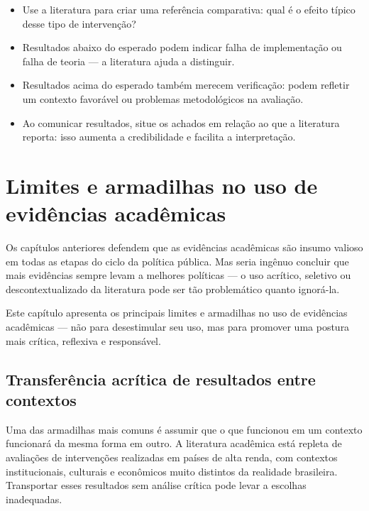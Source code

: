 \documentclass[12pt, a4paper, openany]{book}
\begin{document}
\begin{notabox}
\begin{itemize}[leftmargin=*]
  \item Use a literatura para criar uma referência comparativa: qual é o
    efeito típico desse tipo de intervenção?
  \item Resultados abaixo do esperado podem indicar falha de implementação ou
    falha de teoria --- a literatura ajuda a distinguir.
  \item Resultados acima do esperado também merecem verificação: podem
    refletir um contexto favorável ou problemas metodológicos na avaliação.
  \item Ao comunicar resultados, situe os achados em relação ao que a
    literatura reporta: isso aumenta a credibilidade e facilita a
    interpretação.
\end{itemize}
\end{notabox}

\chapter{Limites e armadilhas no uso de evidências acadêmicas}\label{cap7}

Os capítulos anteriores defendem que as evidências acadêmicas são insumo valioso em todas as etapas do ciclo da política pública. Mas seria ingênuo concluir que mais evidências sempre levam a melhores políticas --- o uso acrítico, seletivo ou descontextualizado da literatura pode ser tão problemático quanto ignorá-la.

Este capítulo apresenta os principais limites e armadilhas no uso de
evidências acadêmicas --- não para desestimular seu uso, mas para promover
uma postura mais crítica, reflexiva e responsável.

\section{Transferência acrítica de resultados entre contextos}

Uma das armadilhas mais comuns é assumir que o que funcionou em um contexto
funcionará da mesma forma em outro. A literatura acadêmica está repleta de
avaliações de intervenções realizadas em países de alta renda, com contextos
institucionais, culturais e econômicos muito distintos da realidade
brasileira. Transportar esses resultados sem análise crítica pode levar a
escolhas inadequadas.
\end{document}
